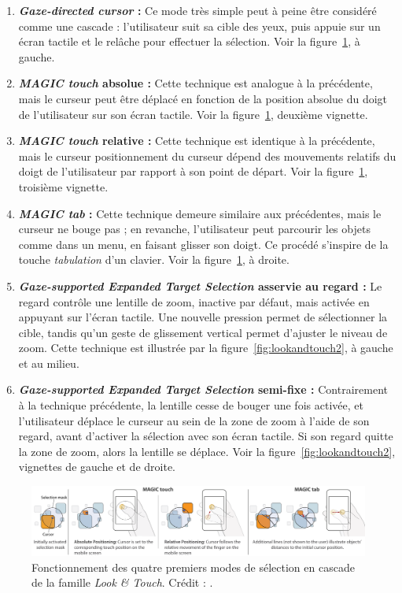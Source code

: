 	\begin{enumerate}
		\item \textbf{\emph{Gaze-directed cursor} :} Ce mode très simple peut à peine être considéré comme une cascade : l'utilisateur suit sa cible des yeux, puis appuie sur un écran tactile et le relâche pour effectuer la sélection. Voir la figure~\ref{fig:lookandtouch}, à gauche.
		\item \textbf{\emph{MAGIC touch} absolue :} Cette technique est analogue à la précédente, mais le curseur peut être déplacé en fonction de la position absolue du doigt de l'utilisateur sur son écran tactile. Voir la figure~\ref{fig:lookandtouch}, deuxième vignette.
		\item \textbf{\emph{MAGIC touch} relative :} Cette technique est identique à la précédente, mais le curseur positionnement du curseur dépend des mouvements relatifs du doigt de l'utilisateur par rapport à son point de départ. Voir la figure~\ref{fig:lookandtouch}, troisième vignette.
		\item \textbf{\emph{MAGIC tab} :} Cette technique demeure similaire aux précédentes, mais le curseur ne bouge pas ; en revanche, l'utilisateur peut parcourir les objets comme dans un menu, en faisant glisser son doigt. Ce procédé s'inspire de la touche \emph{tabulation} d'un clavier. Voir la figure~\ref{fig:lookandtouch}, à droite.
		\item \textbf{\emph{Gaze-supported Expanded Target Selection} asservie au regard :} Le regard contrôle une lentille de zoom, inactive par défaut, mais activée en appuyant sur l'écran tactile. Une nouvelle pression permet de sélectionner la cible, tandis qu'un geste de glissement vertical permet d'ajuster le niveau de zoom. Cette technique est illustrée par la figure~\ref{fig:lookandtouch2}, à gauche et au milieu.
		\item \textbf{\emph{Gaze-supported Expanded Target Selection} semi-fixe :} Contrairement à la technique précédente, la lentille cesse de bouger une fois activée, et l'utilisateur déplace le curseur au sein de la zone de zoom à l'aide de son regard, avant d'activer la sélection avec son écran tactile. Si son regard quitte la zone de zoom, alors la lentille se déplace. Voir la figure~\ref{fig:lookandtouch2}, vignettes de gauche et de droite.
	\end{enumerate}
	
	\begin{figure}[htb]
		\centering
		\includegraphics[width=\textwidth]{figures/ch2/lookandtouch}
		\caption[\emph{Look \&{} Touch -- principe}]{Fonctionnement des quatre premiers modes de sélection en cascade de la famille \emph{Look \&{} Touch}. Crédit : \cite{stellmach2012look}.}
		\label{fig:lookandtouch}
	\end{figure}
	
